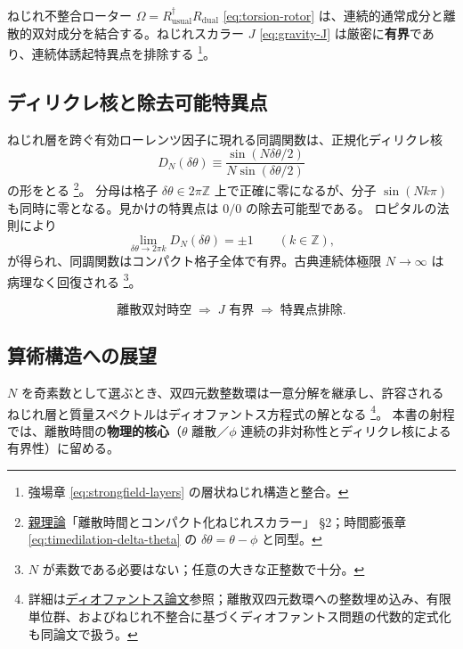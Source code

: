 \documentclass[dvipdfmx,a4paper,oneside]{jsbook}
\numberwithin{equation}{chapter}
\begin{document}
ねじれ不整合ローター \(\Omega = R_{\mathrm{usual}}^\dagger R_{\mathrm{dual}}\) \eqref{eq:torsion-rotor} は、連続的通常成分と離散的双対成分を結合する。ねじれスカラー \(J\) \eqref{eq:gravity-J} は厳密に\textbf{有界}であり、連続体誘起特異点を排除する \footnote{強場章 \eqref{eq:strongfield-layers} の層状ねじれ構造と整合。}。

\subsection{ディリクレ核と除去可能特異点}

ねじれ層を跨ぐ有効ローレンツ因子に現れる同調関数は、正規化ディリクレ核
\begin{equation}
  D_N(\delta\theta)
  \equiv \frac{\sin(N\delta\theta/2)}{N\sin(\delta\theta/2)}
  \label{eq:cosmo-dirichlet}
\end{equation}
の形をとる \footnote{\hyperref[sec:sister-manuscripts]{親理論}「離散時間とコンパクト化ねじれスカラー」 §2；時間膨張章 \eqref{eq:timedilation-delta-theta} の \(\delta\theta = \theta - \phi\) と同型。}。
分母は格子 \(\delta\theta \in 2\pi\mathbb{Z}\) 上で正確に零になるが、分子 \(\sin(Nk\pi)\) も同時に零となる。見かけの特異点は \(0/0\) の除去可能型である。
ロピタルの法則により
\begin{equation}
  \lim_{\delta\theta \to 2\pi k} D_N(\delta\theta) = \pm 1
  \qquad (k \in \mathbb{Z}),
  \label{eq:cosmo-dirichlet-limit}
\end{equation}
が得られ、同調関数はコンパクト格子全体で有界。古典連続体極限 \(N \to \infty\) は病理なく回復される \footnote{\(N\) が素数である必要はない；任意の大きな正整数で十分。}。

\begin{equation}
  \boxed{\;
  \text{離散双対時空} \;\Longrightarrow\;
  J \text{ 有界} \;\Longrightarrow\;
  \text{特異点排除}.
  \;}
  \label{eq:cosmo-bounded-J}
\end{equation}

\subsection{算術構造への展望}

\(N\) を奇素数として選ぶとき、双四元数整数環は一意分解を継承し、許容されるねじれ層と質量スペクトルはディオファントス方程式の解となる \footnote{詳細は\hyperref[sec:sister-manuscripts]{ディオファントス論文}参照；離散双四元数環への整数埋め込み、有限単位群、およびねじれ不整合に基づくディオファントス問題の代数的定式化も同論文で扱う。}。
本書の射程では、離散時間の\textbf{物理的核心}（\(\theta\) 離散／\(\phi\) 連続の非対称性とディリクレ核による有界性）に留める。
\end{document}
